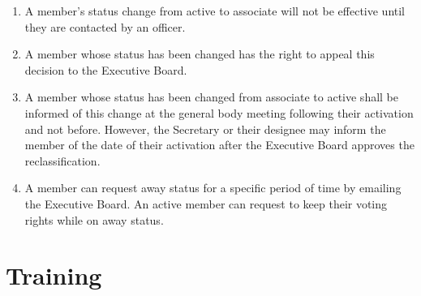 \documentclass[12pt,letterpaper,oneside]{book}
\begin{document}
\begin{enumerate}

\item A member's status change from active to associate will not be effective until they are contacted by an officer.
\item A member whose status has been changed has the right to appeal this decision to the Executive Board.
\item A member whose status has been changed from associate to active shall be
    informed of this change at the general body meeting following their
    activation and not before. However, the Secretary or their designee may
    inform the member of the date of their activation after the Executive Board
    approves the reclassification.
\item A member can request away status for a specific period of time by emailing the Executive Board.  An active member can request to keep their voting rights while on away status.

\end{enumerate}

\section{Training}
\end{document}

